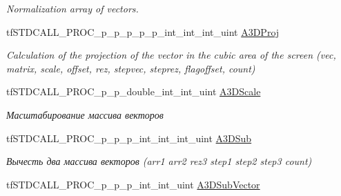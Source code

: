\begin{DoxyCompactItemize}
\begin{DoxyCompactList}\small\item\em Normalization array of vectors. \end{DoxyCompactList}\item 
\hypertarget{structs_functions_array_vector_c_p_u_a6513530559504ec02d709855ec6670e9}{tf\-S\-T\-D\-C\-A\-L\-L\-\_\-\-P\-R\-O\-C\-\_\-p\-\_\-p\-\_\-p\-\_\-p\-\_\-p\-\_\-int\-\_\-int\-\_\-int\-\_\-uint \hyperlink{structs_functions_array_vector_c_p_u_a6513530559504ec02d709855ec6670e9}{A3\-D\-Proj}}\label{structs_functions_array_vector_c_p_u_a6513530559504ec02d709855ec6670e9}

\begin{DoxyCompactList}\small\item\em Calculation of the projection of the vector in the cubic area of the screen (vec, matrix, scale, offset, rez, stepvec, steprez, flagoffset, count) \end{DoxyCompactList}\item 
\hypertarget{structs_functions_array_vector_c_p_u_ae6941d220c68e247067e006cfed70ef7}{tf\-S\-T\-D\-C\-A\-L\-L\-\_\-\-P\-R\-O\-C\-\_\-p\-\_\-p\-\_\-double\-\_\-int\-\_\-int\-\_\-uint \hyperlink{structs_functions_array_vector_c_p_u_ae6941d220c68e247067e006cfed70ef7}{A3\-D\-Scale}}\label{structs_functions_array_vector_c_p_u_ae6941d220c68e247067e006cfed70ef7}

\begin{DoxyCompactList}\small\item\em Масштабирование массива векторов \end{DoxyCompactList}\item 
\hypertarget{structs_functions_array_vector_c_p_u_af5491f3d9faa4cd158197416b76538b8}{tf\-S\-T\-D\-C\-A\-L\-L\-\_\-\-P\-R\-O\-C\-\_\-p\-\_\-p\-\_\-p\-\_\-int\-\_\-int\-\_\-int\-\_\-uint \hyperlink{structs_functions_array_vector_c_p_u_af5491f3d9faa4cd158197416b76538b8}{A3\-D\-Sub}}\label{structs_functions_array_vector_c_p_u_af5491f3d9faa4cd158197416b76538b8}

\begin{DoxyCompactList}\small\item\em Вычесть два массива векторов (arr1 arr2 rez3 step1 step2 step3 count) \end{DoxyCompactList}\item 
\hypertarget{structs_functions_array_vector_c_p_u_aeb70808e3e007d99f8c38a0dda1e1949}{tf\-S\-T\-D\-C\-A\-L\-L\-\_\-\-P\-R\-O\-C\-\_\-p\-\_\-p\-\_\-p\-\_\-int\-\_\-int\-\_\-uint \hyperlink{structs_functions_array_vector_c_p_u_aeb70808e3e007d99f8c38a0dda1e1949}{A3\-D\-Sub\-Vector}}\label{structs_functions_array_vector_c_p_u_aeb70808e3e007d99f8c38a0dda1e1949}


\end{DoxyCompactItemize}

